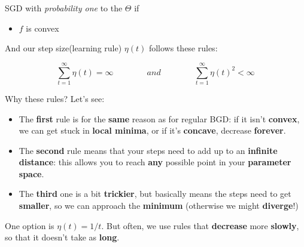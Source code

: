        \begin{theorem}
            SGD  with \textit{probability one} to the  $\Theta$ if
            
            \begin{itemize}
                \item $f$ is convex
            \end{itemize}
            
            And our step size(learning rule) $\eta(t)$ follows these rules:
            
            \begin{equation*}
                \sum_{t=1}^{\infty} \eta(t) = \infty
                \qquad \qquad
                and
                \qquad \qquad
                \sum_{t=1}^{\infty} \eta(t)^2 < \infty
            \end{equation*}
        \end{theorem}
        
        Why these rules? Let's see:
        
        \begin{itemize}
            \item The \textbf{first} rule is for the \textbf{same} reason as for regular BGD: if it isn't \textbf{convex}, we can get stuck in \textbf{local minima}, or if it's \textbf{concave}, decrease \textbf{forever}.
            
            \item The \textbf{second} rule means that your steps need to add up to an \textbf{infinite distance}: this allows you to reach \textbf{any} possible point in your \textbf{parameter space}.
            
            \item The \textbf{third} one is a bit \textbf{trickier}, but basically means the steps need to get \textbf{smaller}, so we can approach the \textbf{minimum} (otherwise we might \textbf{diverge}!)
        \end{itemize}
        
        One option is $\eta(t)=1/t$. But often, we use rules that \textbf{decrease} more \textbf{slowly}, so that it doesn't take as \textbf{long}.

